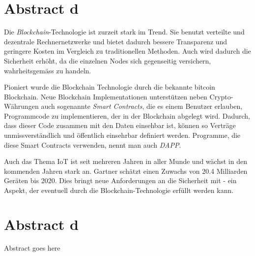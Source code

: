 \chapter{Abstract d}
\label{cha:abstract_d}

Die \emph{Blockchain}-Technologie ist zurzeit stark im Trend. Sie benutzt verteilte und dezentrale Rechnernetzwerke und bietet dadurch bessere Transparenz und geringere Kosten im Vergleich zu traditionellen Methoden. Auch wird dadurch die Sicherheit erhöht, da die einzelnen Nodes sich gegenseitig versichern, wahrheitsgemäss zu handeln.\cite{BlockchainRevolution}

Pioniert wurde die Blockchain Technologie durch die bekannte bitcoin Blockchain. Neue Blockchain Implementationen unterstützen neben Crypto-Währungen auch sogenannte \emph{Smart Contracts}, die es einem Benutzer erlauben, Programmcode zu implementieren, der in der Blockchain abgelegt wird. Dadurch, dass dieser Code zusammen mit den Daten einsehbar ist, können so Verträge unmissverständlich und öffentlich einsehrbar definiert werden. Programme, die diese Smart Contracts verwenden, nennt man auch \emph{\acrfull{DAPP}}.\cite{BlockchainRevolution}

Auch das Thema \acrshort{IoT} ist seit mehreren Jahren in aller Munde und wächst in den kommenden Jahren stark an. Gartner schätzt einen Zuwachs von 20.4 Milliarden Geräten bis 2020. Dies bringt neue Anforderungen an die Sicherheit mit - ein Aspekt, der eventuell durch die Blockchain-Technologie erfüllt werden kann.\cite{gartner.com_iot,BlockchainRevolution}



\chapter{Abstract d}
\label{cha:abstract_d}

Abstract goes here
